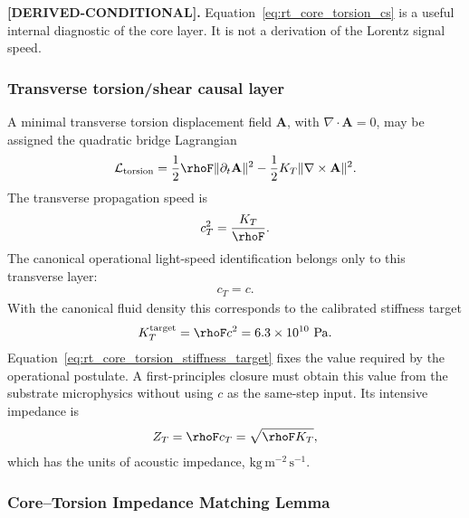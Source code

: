\textbf{[DERIVED-CONDITIONAL].}
Equation~\eqref{eq:rt_core_torsion_cs} is a useful internal diagnostic of the core layer. It is not a derivation of the Lorentz signal speed.

\subsubsection{Transverse torsion/shear causal layer}

A minimal transverse torsion displacement field \(\mathbf A\), with \(\nabla\cdot\mathbf A=0\), may be assigned the quadratic bridge Lagrangian
\begin{align}
    \mathcal L_{\rm torsion}
    =
    \frac12\rhoF\lVert\partial_t\mathbf A\rVert^2
    -
    \frac12K_T\lVert\nabla\times\mathbf A\rVert^2 .
\end{align}
The transverse propagation speed is
\begin{align}
    c_T^2=\frac{K_T}{\rhoF}.
\end{align}
The canonical operational light-speed identification belongs only to this
transverse layer:
\begin{align}
    c_T=c.
    \label{eq:rt_core_torsion_operational_c}
\end{align}
With the canonical fluid density this corresponds to the calibrated stiffness
target
\begin{align}
    K_T^{\mathrm{target}}
    =
    \rhoF c^2
    =
    6.3\times10^{10}\ \mathrm{Pa}.
    \label{eq:rt_core_torsion_stiffness_target}
\end{align}
Equation~\eqref{eq:rt_core_torsion_stiffness_target} fixes the value required by
the operational postulate. A first-principles closure must obtain this value from
the substrate microphysics without using \(c\) as the same-step input.
Its intensive impedance is
\begin{align}
    Z_T=\rhoF c_T=\sqrt{\rhoF K_T},
\end{align}
which has the units of acoustic impedance, \(\mathrm{kg\,m^{-2}\,s^{-1}}\).

\subsubsection{Core--Torsion Impedance Matching Lemma}

